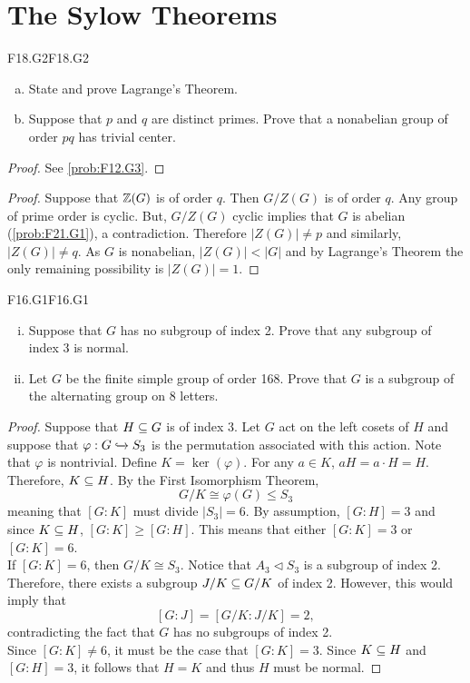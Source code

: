 \documentclass[../AlgebraQualSolutions.tex]{subfiles}
\begin{document}
\section{The Sylow Theorems}
	\begin{prob}{F18.G2}{F18.G2}
		\begin{enumerate}[(a)]
			\item State and prove Lagrange's Theorem.
			\item Suppose that $p$ and $q$ are distinct primes. Prove that a nonabelian group of order $pq$ has trivial center.
		\end{enumerate}
	\end{prob}

	\begin{proof}
		See \ref{prob:F12.G3}.
	\end{proof}

	\begin{proof}
		Suppose that $\mathbb{Z}(G)$ is of order $q$. Then $G/Z(G)$ is of order $q$. Any group of prime order is cyclic. But, $G/Z(G)$ cyclic implies that $G$ is abelian (\ref{prob:F21.G1}), a contradiction. Therefore $|Z(G)| \neq p$ and similarly, $|Z(G)| \neq q$. As $G$ is nonabelian, $|Z(G)| < |G|$ and by Lagrange's Theorem the only remaining possibility is $|Z(G)| =1$.
	\end{proof}


	\begin{prob}{F16.G1}{F16.G1}
		\begin{enumerate}[(i)]
			\item Suppose that $G$ has no subgroup of index 2. Prove that any subgroup of index 3 is normal.
			\item Let $G$ be the finite simple group of order 168. Prove that $G$ is a subgroup of the alternating group on 8 letters.
		\end{enumerate}
	\end{prob}

	\begin{proof}
		Suppose that $H \subseteq G$ is of index 3. Let $G$ act on the left cosets of $H$ and suppose that $\varphi: G \xhookrightarrow{} S_3$ is the permutation associated with this action. Note that $\varphi$ is nontrivial. Define $K = \ker(\varphi)$. For any $a \in K$, $aH = a \cdot H = H$. Therefore, $K \subseteq H$. By the First Isomorphism Theorem,
			\[G/K \cong \varphi(G) \leq S_3 \]
		meaning that $[G:K]$ must divide $|S_3| = 6$. By assumption, $[G:H] = 3$ and since $K \subseteq H$, $[G:K] \geq [G:H]$. This means that either $[G:K] = 3$ or $[G:K] = 6$.\\

		If $[G:K] = 6$, then $G/K \cong S_3$. Notice that $A_3 \triangleleft S_3$ is a subgroup of index 2. Therefore, there exists a subgroup $J/K \subseteq G/K$ of index 2. However, this would imply that
			\[[G:J] = [G/K: J/K] = 2,\]
		contradicting the fact that $G$ has no subgroups of index 2.\\

		Since $[G:K] \neq 6$, it must be the case that $[G:K] = 3$. Since $K \subseteq H$ and $[G:H] = 3$, it follows that $H = K$ and thus $H$ must be normal.
	\end{proof}
\end{document}
